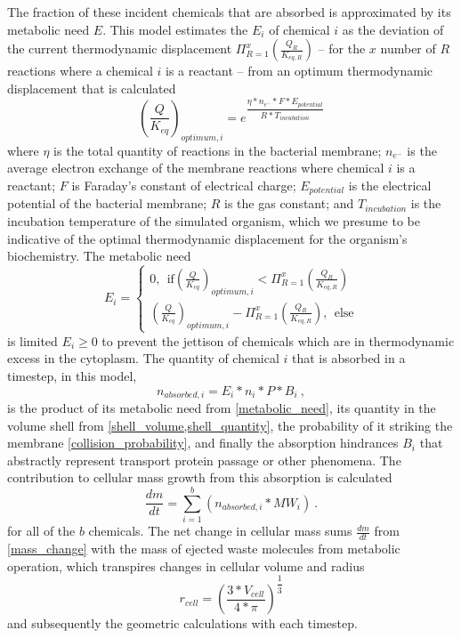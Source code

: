 \begin{supplementary}
The fraction of these incident chemicals that are absorbed is approximated by its metabolic need $E$. This model estimates the $E_i$ of chemical $i$ as the deviation of the current thermodynamic displacement $\Pi_{R=1}^x (\frac{Q_R}{K_{eq, R}})$ -- for the $x$ number of $R$ reactions where a chemical $i$ is a reactant  -- from an optimum thermodynamic displacement that is calculated
\begin{equation}
    \left(\frac{Q}{K_{eq}}\right)_{optimum,i}=e^{\dfrac{\eta*n_{e^-}* F * E_{potential}}{R*T_{incubation}}}
\end{equation}
where $\eta$ is the total quantity of reactions in the bacterial membrane; $n_{e^-}$ is the average electron exchange of the membrane reactions where chemical $i$ is a reactant; $F$ is Faraday’s constant of electrical charge; $E_{potential}$ is the electrical potential of the bacterial membrane; $R$ is the gas constant; and $T_{incubation}$ is the incubation temperature of the simulated organism, which we presume to be indicative of the optimal thermodynamic displacement for the organism's biochemistry. The metabolic need
\begin{equation} \label{metabolic_need}
    E_i= \begin{cases}
            0, ~~\text{if} \left(\frac{Q}{K_{eq}}\right)_{optimum,i}<\Pi_{R=1}^x \left(\frac{Q_R}{K_{eq, R}}\right) \\
            \left(\frac{Q}{K_{eq}}\right)_{optimum,i}-\Pi_{R=1}^x \left(\frac{Q_R}{K_{eq, R}}\right), ~~\text{else}
        \end{cases} 
\end{equation}
is limited $E_i\ge0$ to prevent the jettison of chemicals which are in thermodynamic excess in the cytoplasm. The quantity of chemical $i$ that is absorbed in a timestep, in this model, 
\begin{equation}
    n_{absorbed,i}=E_i*n_i*P*B_i~,
\end{equation}
is the product of its metabolic need from \cref{metabolic_need}, its quantity in the volume shell from \cref{shell_volume,shell_quantity}, the probability of it striking the membrane \cref{collision_probability}, and finally the absorption hindrances $B_i$ that abstractly represent transport protein passage or other phenomena. The contribution to cellular mass growth from this absorption is calculated
\begin{equation} \label{mass_change}
    \frac{dm}{dt}=\sum_{i=1}^b(n_{absorbed,i}*MW_i)~.
\end{equation}
for all of the $b$ chemicals. The net change in cellular mass sums $\frac{dm}{dt}$ from \cref{mass_change} with the mass of ejected waste molecules from metabolic operation, which transpires changes in cellular volume and radius
\begin{equation}
    r_{cell}=\left(\frac{3*V_{cell}}{4*\pi}\right)^{\dfrac{1}{3}}    
\end{equation}
and subsequently the geometric calculations with each timestep. 



\end{supplementary}
